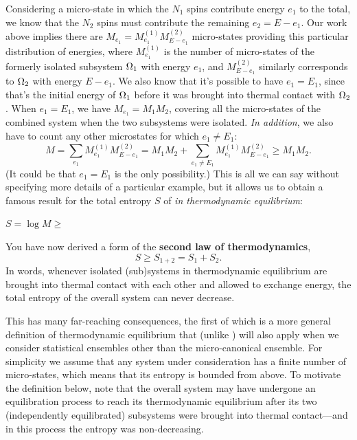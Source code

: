 Considering a micro-state in which the $N_1$ spins contribute energy $e_1$ to the total, we know that the $N_2$ spins must contribute the remaining $e_2 = E - e_1$.
Our work above implies there are $M_{e_1} = M_{e_1}^{(1)} M_{E - e_1}^{(2)}$ micro-states providing this particular distribution of energies, where $M_{e_1}^{(1)}$ is the number of micro-states of the formerly isolated subsystem $\Omega_1$ with energy $e_1$, and $M_{E - e_1}^{(2)}$ similarly corresponds to $\Omega_2$ with energy $E - e_1$.
We also know that it's possible to have $e_1 = E_1$, since that's the initial energy of $\Omega_1$ before it was brought into thermal contact with $\Omega_2$.
When $e_1 = E_1$, we have $M_{e_1} = M_1 M_2$, covering all the micro-states of the combined system when the two subsystems were isolated.
\textit{In addition}, we also have to count any other microstates for which $e_1 \ne E_1$:
\begin{equation*}
  M = \sum_{e_1} M_{e_1}^{(1)} M_{E - e_1}^{(2)} = M_1 M_2 + \sum_{e_1 \ne E_1} M_{e_1}^{(1)} M_{E - e_1}^{(2)} \geq M_1 M_2.
\end{equation*}
(It could be that $e_1 = E_1$ is the only possibility.)
This is all we can say without specifying more details of a particular example, but it allows us to obtain a famous result for the total entropy $S$ of \Om \textit{in thermodynamic equilibrium}:
\begin{mdframed}
  $S = \log M \geq $ \\[100 pt]
\end{mdframed}

\begin{shaded}
  You have now derived a form of the \textbf{second law of thermodynamics},
  \begin{equation*}
    S \geq S_{1 + 2} = S_1 + S_2.
  \end{equation*}
  In words, whenever isolated (sub)systems in thermodynamic equilibrium are brought into thermal contact with each other and allowed to exchange energy, the total entropy of the overall system can never decrease.
\end{shaded}

This has many far-reaching consequences, the first of which is a more general definition of thermodynamic equilibrium that (unlike ) will also apply when we consider statistical ensembles other than the micro-canonical ensemble.
For simplicity we assume that any system under consideration has a finite number of micro-states, which means that its entropy is bounded from above.
To motivate the definition below, note that the overall system \Om may have undergone an equilibration process to reach its thermodynamic equilibrium after its two (independently equilibrated) subsystems were brought into thermal contact---and in this process the entropy was non-decreasing.

